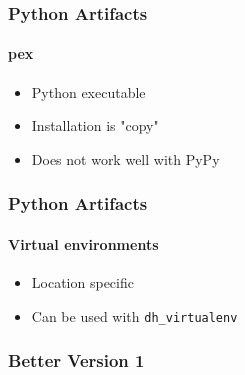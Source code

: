 \documentclass{beamer}
\begin{document}
\begin{frame}[fragile]
\frametitle{Python Artifacts}
\framesubtitle{pex}
\begin{itemize}
\item Python executable
\item Installation is "copy"
\item Does not work well with PyPy
\end{itemize}
\end{frame}

\begin{frame}[fragile]
\frametitle{Python Artifacts}
\framesubtitle{Virtual environments}
\begin{itemize}
\item Location specific
\item Can be used with \verb|dh_virtualenv|
\end{itemize}
\end{frame}

\begin{frame}[fragile]
\frametitle{Better Version 1}

\end{frame}
\end{document}

